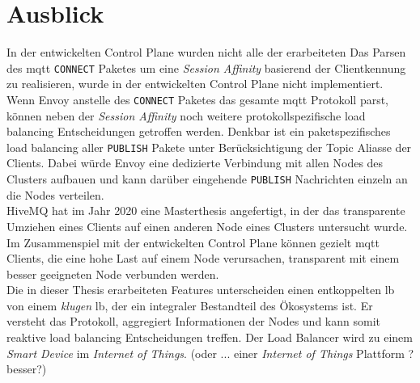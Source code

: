 \section{Ausblick}
In der entwickelten Control Plane wurden nicht alle der erarbeiteten 
Das Parsen des \ac{mqtt} \verb|CONNECT| Paketes um eine \textit{Session Affinity} basierend der Clientkennung zu realisieren, wurde in der entwickelten Control Plane nicht implementiert.
Wenn Envoy anstelle des \verb|CONNECT| Paketes das gesamte \ac{mqtt} Protokoll parst, können neben der \textit{Session Affinity} noch weitere protokollspezifische load balancing Entscheidungen getroffen werden.
Denkbar ist ein paketspezifisches load balancing aller \verb|PUBLISH| Pakete unter Berücksichtigung der Topic Aliasse der Clients. Dabei würde Envoy eine dedizierte Verbindung mit allen Nodes des Clusters aufbauen und kann darüber eingehende \verb|PUBLISH| Nachrichten einzeln an die Nodes verteilen.
\\
HiveMQ hat im Jahr 2020 eine Masterthesis angefertigt, in der das transparente Umziehen eines Clients auf einen anderen Node eines Clusters untersucht wurde. Im Zusammenspiel mit der entwickelten Control Plane können gezielt \ac{mqtt} Clients, die eine hohe Last auf einem Node verursachen, transparent mit einem besser geeigneten Node verbunden werden.
\\
Die in dieser Thesis erarbeiteten Features unterscheiden einen entkoppelten \acl{lb} von einem \textit{klugen} \acl{lb}, der ein integraler Bestandteil des Ökosystems ist. Er versteht das Protokoll, aggregiert Informationen der Nodes und kann somit reaktive load balancing Entscheidungen treffen. Der Load Balancer wird zu einem \textit{Smart Device} im \textit{Internet of Things}. (oder ... einer \textit{Internet of Things} Plattform ? besser?)

